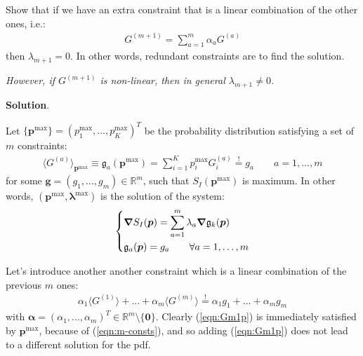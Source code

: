\documentclass[../../main.tex]{subfiles}
\begin{document}
\begin{exo}
    Show that if we have an extra constraint that is a linear combination of the other ones, i.e.:
    \begin{align}\label{eqn:Gm1}
        G^{(m+1)} = \sum_{a=1}^m \alpha_a G^{(a)}
    \end{align}
    then $\lambda_{m+1} = 0$. In other words, redundant constraints are  to find the solution.

    \medskip

    \textit{However, if $G^{(m+1)}$ is non-linear, then in general $\lambda_{m+1} \neq 0$.}
    
    \medskip

    \textbf{Solution}.

    Let $\{\bm{p}^{\max}\} = (p_1^{\max},\dots, p_K^{\max})^T$ be the probability distribution satisfying a set of $m$ constraints:
    \begin{align}\label{eqn:m-consts}
        \langle G^{(a)} \rangle_{\bm{p}^{\max}} \equiv \mathfrak{g}_a(\bm{p}^{\max}) = \sum_{i=1}^K p_i^{\max} G_i^{(a)} \overset{!}{=} g_a \qquad a=1,\dots,m
    \end{align}
    for some $\bm{g} = (g_1,\dots,g_m) \in \mathbb{R}^m$,    such that $S_I(\bm{p}^{\max})$ is maximum. In other words, $(\bm{p}^{\max}, \bm{\lambda}^{\max})$ is the solution of the system:
    \begin{align}\label{eqn:Lag1}
        \begin{dcases}
            \grad S_I(\bm{p}) = \sum_{a=1}^m \lambda_a \grad \mathfrak{g}_k (\bm{p}) \\
            \mathfrak{g}_a(\bm{p}) = g_a \qquad \forall a = 1,\dots,m
        \end{dcases}
    \end{align}


    Let's introduce another another constraint which is a linear combination of the previous $m$ ones:
    \begin{align} \label{eqn:Gm1p}
        \alpha_1 \langle G^{(1)} \rangle + \dots + \alpha_m \langle G^{(m)} \rangle \overset{!}{=} \alpha_1 g_1 + \dots + \alpha_m g_m
    \end{align} 
    with $\bm{\alpha} = (\alpha_1, \dots, \alpha_m)^T \in \mathbb{R}^m \setminus \{\bm{0}\}$. Clearly (\ref{eqn:Gm1p}) is immediately satisfied by $\bm{p}^{\max}$, because of (\ref{eqn:m-consts}), and so adding (\ref{eqn:Gm1p}) does not lead to a different solution for the pdf.


\end{exo}
\end{document}
